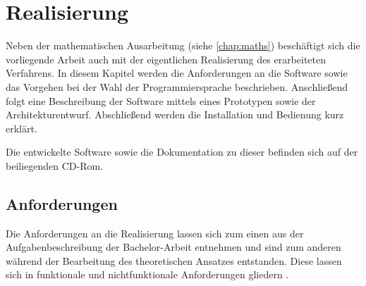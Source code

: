 \chapter{Realisierung}
\label{chap:impl}
Neben der mathematischen Ausarbeitung (siehe \autoref{chap:maths}) beschäftigt sich die vorliegende Arbeit auch mit der eigentlichen Realisierung des erarbeiteten Verfahrens. In diesem Kapitel werden die Anforderungen an die Software sowie das Vorgehen bei der Wahl der Programmiersprache beschrieben. Anschließend folgt eine Beschreibung der Software mittels eines Prototypen sowie der Architekturentwurf. Abschließend werden die Installation und Bedienung kurz erklärt.

Die entwickelte Software sowie die Dokumentation zu dieser befinden sich auf der beiliegenden CD-Rom.

\section{Anforderungen}
Die Anforderungen an die Realisierung lassen sich zum einen aus der Aufgabenbeschreibung der Bachelor-Arbeit entnehmen und sind zum anderen während der Bearbeitung des theoretischen Ansatzes entstanden. Diese lassen sich in funktionale und nichtfunktionale Anforderungen gliedern  \cite[S. 369f]{ludewig}.
